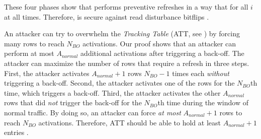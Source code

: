 These four phases show that \X{} performs preventive refreshes in a way that  for all $i$ at all times.
Therefore, \X{} is secure against read disturbance bitflips  .

An attacker can try to overwhelm the \emph{ Tracking Table} (ATT, see ) by forcing many rows to reach $N_{BO}$ activations.
Our proof shows that an attacker can perform at most $A_{normal}$ additional activations after triggering a back-off.
The attacker can maximize the number of rows that require a refresh in three steps.
First, the attacker activates $A_{normal} + 1$ rows $N_{BO} - 1$ times each \emph{without} triggering a back-off.
Second, the attacker activates one of the rows for the $N_{BO}$th time, which triggers a back-off.
Third, the attacker activates the other $A_{normal}$ rows that did \emph{not} trigger the back-off for the $N_{BO}$th time during the window of normal traffic.
By doing so, an attacker can force \emph{at most} $A_{normal} + 1$ rows to reach $N_{BO}$ activations.
Therefore, ATT should be able to hold at least $A_{normal} + 1$ entries .